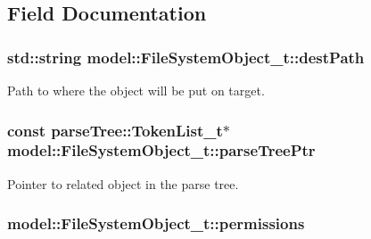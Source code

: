 \subsection{Field Documentation}
\subsubsection[{\texorpdfstring{dest\+Path}{destPath}}]{\setlength{\rightskip}{0pt plus 5cm}std\+::string model\+::\+File\+System\+Object\+\_\+t\+::dest\+Path}\hypertarget{structmodel_1_1_file_system_object__t_a25f1ec1e11afaf82005c2c6b021a3925}{}\label{structmodel_1_1_file_system_object__t_a25f1ec1e11afaf82005c2c6b021a3925}


Path to where the object will be put on target. 

\subsubsection[{\texorpdfstring{parse\+Tree\+Ptr}{parseTreePtr}}]{\setlength{\rightskip}{0pt plus 5cm}const {\bf parse\+Tree\+::\+Token\+List\+\_\+t}$\ast$ model\+::\+File\+System\+Object\+\_\+t\+::parse\+Tree\+Ptr}\hypertarget{structmodel_1_1_file_system_object__t_a0ffb527cd86ef67f573110e08c3841e2}{}\label{structmodel_1_1_file_system_object__t_a0ffb527cd86ef67f573110e08c3841e2}


Pointer to related object in the parse tree. 

\subsubsection[{\texorpdfstring{permissions}{permissions}}]{ model\+::\+File\+System\+Object\+\_\+t\+::permissions}\hypertarget{structmodel_1_1_file_system_object__t_a9e021ff0837eec52c07ea6805e0e79e5}{}\label{structmodel_1_1_file_system_object__t_a9e021ff0837eec52c07ea6805e0e79e5}


